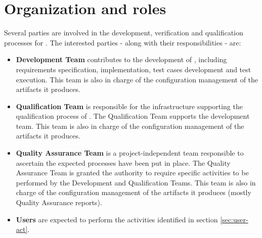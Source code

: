 \section{Organization and roles}
Several parties are involved in the development, verification and qualification processes for \xcov. The interested parties - along with their responsibilities - are:
\begin{itemize}
\item \textbf{\xcov Development Team} contributes to the development of \xcov, including requirements specification, implementation, test cases development and test execution. This team is also in charge of the configuration management of the artifacts it produces.
\item \textbf{\xcov Qualification Team} is responsible for the infrastructure
supporting the qualification process of \xcov. The Qualification Team supports the development team. This team is also in charge of the configuration management of the artifacts it produces.
\item \textbf{\xcov Quality Assurance Team} is a project-independent team responsible to ascertain the expected processes have been put in place. The Quality Assurance Team is granted the authority to require specific activities to be performed by the \xcov Development and Qualification Teams. This team is also in charge of the configuration management of the artifacts it produces (mostly Quality Assurance reports).
\item \textbf{\xcov Users} are expected to perform the activities identified in
section \ref{sec:user-act}.
\end{itemize}
